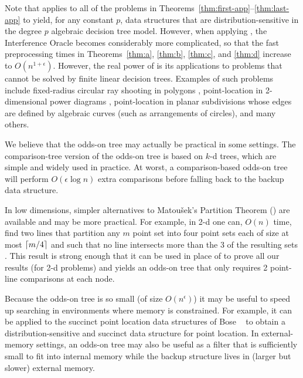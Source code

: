 \documentclass{patmorin}
\begin{document}
Note that  applies to all of the problems
in Theorems~\ref{thm:first-app}--\ref{thm:last-app} to yield, for
any constant $p$, data structures that are distribution-sensitive
in the degree $p$ algebraic decision tree model.  However, when
applying , the Interference Oracle becomes
considerably more complicated, so that the fast preprocessing times in
Theorems~\ref{thm:a}, \ref{thm:b}, \ref{thm:c}, and \ref{thm:d} increase
to $O(n^{1+\epsilon})$.
However, the real power of  is its applications
to problems that cannot be solved by finite linear decision trees.
Examples of such problems include fixed-radius circular ray shooting in
polygons \cite{cceo04}, point-location in 2-dimensional power diagrams
\cite{a87}, point-location in planar subdivisions whose edges are defined
by algebraic curves (such as arrangements of circles), and many others.

We believe that the odds-on tree may actually be practical in some
settings.  The comparison-tree version of the odds-on tree is based on
$k$-d trees, which are simple and widely used in practice. At worst,
a comparison-based odds-on tree will perform $O(\epsilon\log n)$ extra
comparisons before falling back to the backup data structure.

In low dimensions, simpler alternatives to Matou\v{s}ek's Partition
Theorem () are available and may be more
practical.  For example, in 2-d one can, $O(n)$ time, find two lines
that partition any $m$ point set into four point sets each of size at
most ${\lceil m/4 \rceil}$ and such that no line intersects more than the 3 of
the resulting sets \cite{m85}. This result is strong enough that it can
be used in place of  to prove all our results
(for 2-d problems) and yields an odds-on tree that only requires 2
point-line comparisons at each node.

Because the odds-on tree is so small (of size $O(n^\epsilon)$) it
may be useful to speed up searching in environments where memory is
constrained. For example, it can be applied to the succinct point
location data structures of Bose \etal\ \cite{bchmm09} to obtain a
distribution-sensitive and succinct data structure for point location.
In external-memory settings, an odds-on tree may also be useful as a
filter that is sufficiently small to fit into internal memory while the
backup structure lives in (larger but slower) external memory.
\end{document}
